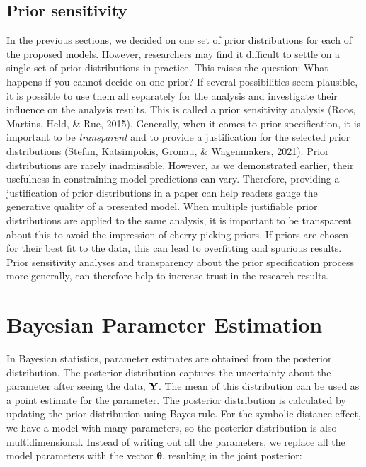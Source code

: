 \documentclass[
  english,
  doc,floatsintext]{apa6}
\begin{document}
\hypertarget{prior-sensitivity}{%
\subsection{Prior sensitivity}\label{prior-sensitivity}}

In the previous sections, we decided on one set of prior distributions for each of the proposed models. However, researchers may find it difficult to settle on a single set of prior distributions in practice. This raises the question: What happens if you cannot decide on one prior? If several possibilities seem plausible, it is possible to use them all separately for the analysis and investigate their influence on the analysis results. This is called a prior sensitivity analysis (Roos, Martins, Held, \& Rue, 2015). Generally, when it comes to prior specification, it is important to be \emph{transparent} and to provide a justification for the selected prior distributions (Stefan, Katsimpokis, Gronau, \& Wagenmakers, 2021). Prior distributions are rarely inadmissible. However, as we demonstrated earlier, their usefulness in constraining model predictions can vary. Therefore, providing a justification of prior distributions in a paper can help readers gauge the generative quality of a presented model. When multiple justifiable prior distributions are applied to the same analysis, it is important to be transparent about this to avoid the impression of cherry-picking priors. If priors are chosen for their best fit to the data, this can lead to overfitting and spurious results. Prior sensitivity analyses and transparency about the prior specification process more generally, can therefore help to increase trust in the research results.

\hypertarget{bayesian-parameter-estimation}{%
\section{Bayesian Parameter Estimation}\label{bayesian-parameter-estimation}}

In Bayesian statistics, parameter estimates are obtained from the posterior distribution. The posterior distribution captures the uncertainty about the parameter after seeing the data, \(\bf{Y}\). The mean of this distribution can be used as a point estimate for the parameter. The posterior distribution is calculated by updating the prior distribution using Bayes rule. For the symbolic distance effect, we have a model with many parameters, so the posterior distribution is also multidimensional. Instead of writing out all the parameters, we replace all the model parameters with the vector \(\bm{\theta}\), resulting in the joint posterior:
\end{document}
